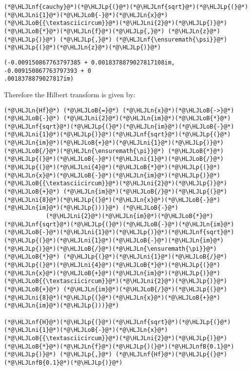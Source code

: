 \documentclass[12pt,landscape]{article}
\newcommand{\HLJLn}[1]{#1}
\newcommand{\HLJLnf}[1]{\textcolor[RGB]{66,102,213}{#1}}
\newcommand{\HLJLnfB}[1]{\textcolor[RGB]{59,151,46}{#1}}
\newcommand{\HLJLni}[1]{\textcolor[RGB]{59,151,46}{#1}}
\newcommand{\HLJLoB}[1]{\textcolor[RGB]{102,102,102}{\textbf{#1}}}
\newcommand{\HLJLp}[1]{#1}
\begin{document}
{\begin{lstlisting}
(*@\HLJLnf{cauchy}@*)(*@\HLJLp{(}@*)(*@\HLJLnf{sqrt}@*)(*@\HLJLp{(}@*)(*@\HLJLni{1}@*)(*@\HLJLoB{-}@*)(*@\HLJLn{x}@*)(*@\HLJLoB{{\textasciicircum}}@*)(*@\HLJLni{2}@*)(*@\HLJLp{)}@*)(*@\HLJLoB{*}@*)(*@\HLJLn{f}@*)(*@\HLJLp{,}@*) (*@\HLJLn{z}@*)(*@\HLJLp{)}@*) (*@\HLJLp{,}@*) (*@\HLJLnf{\ensuremath{\psi}}@*)(*@\HLJLp{(}@*)(*@\HLJLn{z}@*)(*@\HLJLp{)}@*)
\end{lstlisting}

\begin{lstlisting}
(-0.009150867763797385 + 0.0018378879027817108im, -0.009150867763797393 + 0
.0018378879027817im)
\end{lstlisting}


Therefore the Hilbert transform is given by:


\begin{lstlisting}
(*@\HLJLn{Hf}@*) (*@\HLJLoB{=}@*) (*@\HLJLn{x}@*)(*@\HLJLoB{->}@*) (*@\HLJLoB{-}@*) (*@\HLJLni{2}@*)(*@\HLJLn{im}@*)(*@\HLJLoB{*}@*)(*@\HLJLnf{sqrt}@*)(*@\HLJLp{(}@*)(*@\HLJLn{im}@*)(*@\HLJLoB{-}@*)(*@\HLJLni{1}@*)(*@\HLJLp{)}@*)(*@\HLJLnf{sqrt}@*)(*@\HLJLp{(}@*)(*@\HLJLn{im}@*)(*@\HLJLoB{+}@*)(*@\HLJLni{1}@*)(*@\HLJLp{)}@*)(*@\HLJLoB{/}@*)(*@\HLJLn{\ensuremath{\pi}}@*) (*@\HLJLoB{*}@*) (*@\HLJLp{(}@*)(*@\HLJLoB{-}@*)(*@\HLJLni{1}@*)(*@\HLJLoB{/}@*)(*@\HLJLp{(}@*)(*@\HLJLni{4}@*)(*@\HLJLoB{*}@*)(*@\HLJLp{(}@*)(*@\HLJLn{x}@*)(*@\HLJLoB{-}@*)(*@\HLJLn{im}@*)(*@\HLJLp{)}@*)(*@\HLJLoB{{\textasciicircum}}@*)(*@\HLJLni{2}@*)(*@\HLJLp{)}@*) (*@\HLJLoB{+}@*) (*@\HLJLn{im}@*)(*@\HLJLoB{/}@*)(*@\HLJLp{(}@*)(*@\HLJLni{8}@*)(*@\HLJLp{(}@*)(*@\HLJLn{x}@*)(*@\HLJLoB{-}@*)(*@\HLJLn{im}@*)(*@\HLJLp{)))}@*) (*@\HLJLoB{-}@*)
            (*@\HLJLni{2}@*)(*@\HLJLn{im}@*)(*@\HLJLoB{*}@*)(*@\HLJLnf{sqrt}@*)(*@\HLJLp{(}@*)(*@\HLJLoB{-}@*)(*@\HLJLn{im}@*)(*@\HLJLoB{-}@*)(*@\HLJLni{1}@*)(*@\HLJLp{)}@*)(*@\HLJLnf{sqrt}@*)(*@\HLJLp{(}@*)(*@\HLJLni{1}@*)(*@\HLJLoB{-}@*)(*@\HLJLn{im}@*)(*@\HLJLp{)}@*)(*@\HLJLoB{/}@*)(*@\HLJLn{\ensuremath{\pi}}@*) (*@\HLJLoB{*}@*) (*@\HLJLp{(}@*)(*@\HLJLni{1}@*)(*@\HLJLoB{/}@*)(*@\HLJLp{(}@*)(*@\HLJLni{4}@*)(*@\HLJLoB{*}@*)(*@\HLJLp{(}@*)(*@\HLJLn{x}@*)(*@\HLJLoB{+}@*)(*@\HLJLn{im}@*)(*@\HLJLp{)}@*)(*@\HLJLoB{{\textasciicircum}}@*)(*@\HLJLni{2}@*)(*@\HLJLp{)}@*) (*@\HLJLoB{+}@*) (*@\HLJLn{im}@*)(*@\HLJLoB{/}@*)(*@\HLJLp{(}@*)(*@\HLJLni{8}@*)(*@\HLJLp{(}@*)(*@\HLJLn{x}@*)(*@\HLJLoB{+}@*)(*@\HLJLn{im}@*)(*@\HLJLp{)))}@*)

(*@\HLJLnf{H}@*)(*@\HLJLp{(}@*)(*@\HLJLnf{sqrt}@*)(*@\HLJLp{(}@*)(*@\HLJLni{1}@*)(*@\HLJLoB{-}@*)(*@\HLJLn{x}@*)(*@\HLJLoB{{\textasciicircum}}@*)(*@\HLJLni{2}@*)(*@\HLJLp{)}@*)(*@\HLJLoB{*}@*)(*@\HLJLn{f}@*)(*@\HLJLp{)(}@*)(*@\HLJLnfB{0.1}@*)(*@\HLJLp{)}@*) (*@\HLJLp{,}@*) (*@\HLJLnf{Hf}@*)(*@\HLJLp{(}@*)(*@\HLJLnfB{0.1}@*)(*@\HLJLp{)}@*)
\end{lstlisting}

}
\end{document}
